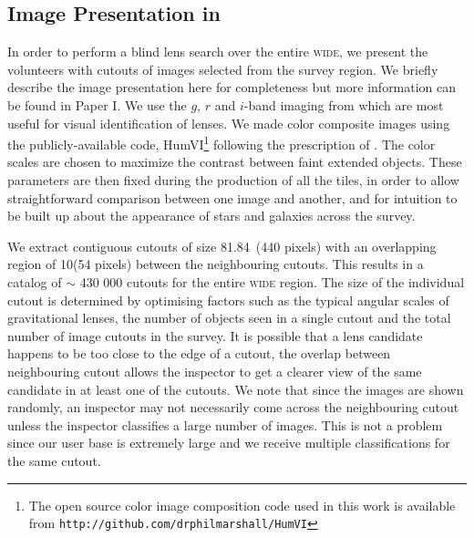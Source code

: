 \documentclass[useAMS,usenatbib,a4paper]{mn2e}
\begin{document}

\subsection{Image Presentation in \sw}
\label{sec:data:impres}

In order to perform a blind lens search over the entire \cfhtls
\textsc{wide}, we present the volunteers with cutouts of images selected
from the survey region. We briefly describe the image presentation here
for completeness but more information can be found in Paper I. We use
the $g$, $r$ and $i$-band imaging from \cfhtls which are most useful for
visual identification of lenses.  We made color composite images using
the publicly-available code, HumVI\footnote{The open source  color image
composition code used in this work is available from
\texttt{http://github.com/drphilmarshall/HumVI}} following the
prescription of \citet{Lupton2004}. The color scales are chosen to
maximize the contrast between faint extended objects. These parameters
are then fixed during the production of all the tiles, in order to allow
straightforward comparison between one image and another, and for
intuition to be built up about the appearance of stars and galaxies
across the survey.

We extract contiguous cutouts of size 81.84\arcsec\ (440 pixels) with an
overlapping region of 10\arcsec (54 pixels) between the neighbouring
cutouts. This  results in a catalog of $\sim$ 430 000 cutouts for the entire \cfhtls
\textsc{wide} region. The size of the individual cutout is determined by
optimising factors such as the typical angular scales of gravitational
lenses, the number of objects seen in a single cutout and the total
number of image cutouts in the survey. It is possible that a lens
candidate happens to be too close to the edge of a cutout, the overlap
between neighbouring cutout allows the inspector to get a clearer view
of the same candidate in at least one of the cutouts. We note that since
the images are shown randomly, an inspector may not necessarily come
across the neighbouring cutout unless the inspector classifies a large
number of images. This is not a problem since our user base is extremely
large and we receive multiple classifications for the same cutout.
\end{document}
